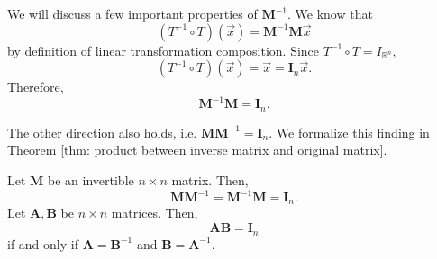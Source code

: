 \documentclass[]{book}
\newcommand{\inv}[1]{\ensuremath{{#1}^{-1}}}
\newcommand{\invm}[1]{\ensuremath{\inv{\mat{#1}}}}
\newcommand{\mat}[1]{\ensuremath{\mathbf{#1}}}
\newcommand{\idmat}[1][n]{\ensuremath{\mat{I}_#1}}
\newcommand{\R}{\ensuremath{\mathbb{R}}}
\begin{document}
We will discuss a few important properties of $\invm{M}$. We know that \[(\inv{T} \circ T)(\vec{x}) = \invm{M} \mat{M} \vec{x}\] by definition of linear transformation composition. Since $\inv{T} \circ T = I_{\R^n}$, \[(\inv{T} \circ T)(\vec{x}) = \vec{x} = \idmat[n]\vec{x}.\] Therefore, \[\invm{M}\mat{M} = \idmat[n].\]

The other direction also holds, i.e. $\mat{M} \invm{M} = \idmat[n]$. We formalize this finding in Theorem \ref{thm: product between inverse matrix and original matrix}.

\begin{theorem}
    \label{thm: product between inverse matrix and original matrix}
    Let $\mat{M}$ be an invertible $n \times n$ matrix. Then, 
    \[\mat{M}\invm{M} = \invm{M}\mat{M} = \idmat[n].\]
    Let $\mat{A},\mat{B}$ be $n \times n$ matrices. Then,
    \[\mat{A}\mat{B} = \idmat[n]\]
    if and only if $\mat{A} = \invm{B}$ and $\mat{B} = \invm{A}$.
\end{theorem}
\end{document}
